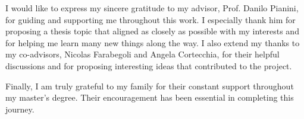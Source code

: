 \documentclass[12pt,a4paper,openright,twoside]{book}
\begin{document}
\nocite{*} %




\begin{acknowledgements}
I would like to express my sincere gratitude to my advisor, Prof. Danilo
Pianini, for guiding and supporting me throughout this work. I especially thank
him for proposing a thesis topic that aligned as closely as possible with my
interests and for helping me learn many new things along the way. I also extend
my thanks to my co-advisors, Nicolas Farabegoli and Angela Cortecchia, for their
helpful discussions and for proposing interesting ideas that contributed to the
project.

Finally, I am truly grateful to my family for their constant support
throughout my master’s degree. Their encouragement has been essential in
completing this journey.
\end{acknowledgements}
\end{document}
